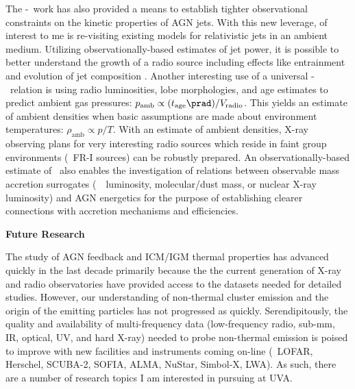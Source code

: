 \documentclass[12pt]{article}
\begin{document}
The \pjet-\prad\ work has also provided a means to establish tighter
observational constraints on the kinetic properties of AGN jets. With
this new leverage, of interest to me is re-visiting existing models
for relativistic jets in an ambient medium. Utilizing
observationally-based estimates of jet power, it is possible to better
understand the growth of a radio source including effects like
entrainment and evolution of jet composition \cite[\'a
  la][]{1999MNRAS.309.1017W}. Another interesting use of a universal
\pjet-\prad\ relation is using radio luminosities, lobe morphologies,
and age estimates to predict ambient gas pressures: $p_{\mathrm{amb}}
\propto (t_{\mathrm{age}}\prad) / V_{\mathrm{radio}}$. This yields an
estimate of ambient densities when basic assumptions are made about
environment temperatures: $\rho_{\mathrm{amb}} \propto p/T$. With an
estimate of ambient densities, X-ray observing plans for very
interesting radio sources which reside in faint group environments
(\ie\ FR-I sources) can be robustly prepared. An observationally-based
estimate of \pjet\ also enables the investigation of relations between
observable mass accretion surrogates (\ie\ \halpha\ luminosity,
molecular/dust mass, or nuclear X-ray luminosity) and AGN energetics
for the purpose of establishing clearer connections with accretion
mechanisms and efficiencies.

{\bf{Future Research}}


The study of AGN feedback and ICM/IGM thermal properties has advanced
quickly in the last decade primarily because the the current
generation of X-ray and radio observatories have provided access to
the datasets needed for detailed studies. However, our understanding
of non-thermal cluster emission and the origin of the emitting
particles has not progressed as quickly. Serendipitously, the quality
and availability of multi-frequency data (low-frequency radio, sub-mm,
IR, optical, UV, and hard X-ray) needed to probe non-thermal emission
is poised to improve with new facilities and instruments coming
on-line (\ie\ LOFAR, Herschel, SCUBA-2, SOFIA, ALMA, NuStar, Simbol-X,
LWA). As such, there are a number of research topics I am interested
in pursuing at UVA.
\end{document}
